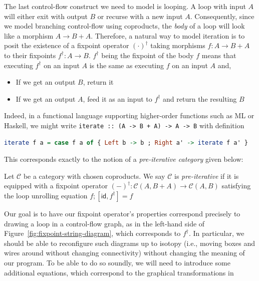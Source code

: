 \documentclass[acmsmall,screen,anonymous,review]{acmart}
\newcommand{\mc}[1]{\ensuremath{\mathcal{#1}}}
\newcommand{\ms}[1]{\ensuremath{\mathsf{#1}}}
\begin{document}
The last control-flow construct we need to model is looping. A loop with input $A$ will either exit
with output $B$ or recurse with a new input $A$. Consequently, since we model branching control-flow
using coproducts, the \emph{body} of a loop will look like a morphism $A \to B + A$. Therefore, a
natural way to model iteration is to posit the existence of a fixpoint operator $(\cdot)^\dagger$
taking morphisms $f: A \to B + A$ to their fixpoints $f^\dagger: A \to B$. $f^\dagger$ being the
fixpoint of the body $f$ means that executing $f^\dagger$ on an input $A$ is the same as executing
$f$ on an input $A$ and,
\begin{itemize}
  \item If we get an output $B$, return it
  \item If we get an output $A$, feed it as an input to $f^\dagger$ and return the resulting $B$
\end{itemize}
Indeed, in a functional language supporting higher-order functions such as ML or Haskell, we might
write \texttt{iterate :: (A -> B + A) -> A -> B} with definition
\begin{center}
  \begin{minipage}{0.85\textwidth}
    \begin{lstlisting}[language=Haskell]
      iterate f a = case f a of { Left b -> b ; Right a' -> iterate f a' }
    \end{lstlisting}
  \end{minipage}
\end{center}
This corresponds exactly to the notion of a \emph{pre-iterative category} given below:
\begin{definition}
  Let $\mc{C}$ be a category with chosen coproducts. We say $\mc{C}$ is \emph{pre-iterative} if it
  is equipped with a fixpoint operator $(-)^\dagger : \mc{C}(A, B + A) \to \mc{C}(A, B)$ satisfying
  the loop unrolling equation $f ; [\ms{id}, f^\dagger] = f$
\end{definition}
Our goal is to have our fixpoint operator's properties correspond precisely to drawing a loop in a
control-flow graph, as in the left-hand side of Figure~\ref{fig:fixpoint-string-diagram}, which
corresponds to $f^\dagger$. In particular, we should be able to reconfigure such diagrams up to
isotopy (i.e., moving boxes and wires around without changing connectivity) without changing the
meaning of our program. To be able to do so soundly, we will need to introduce some additional
equations, which correspond to the graphical transformations in
\end{document}
